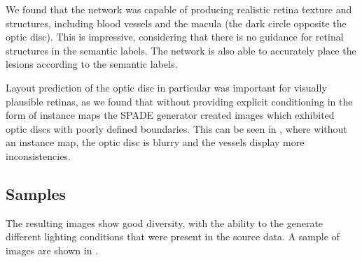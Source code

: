 We found that the network was capable of producing realistic retina texture and structures, including blood vessels and the macula (the dark circle opposite the optic disc).
This is impressive, considering that there is no guidance for retinal structures in the semantic labels.
The network is also able to accurately place the lesions according to the semantic labels.

Layout prediction of the optic disc in particular was important for visually plausible retinas, as we found that without providing explicit conditioning in the form of instance maps the SPADE generator created images which exhibited optic discs with poorly defined boundaries.
This can be seen in , where without an instance map, the optic disc is blurry and the vessels display more inconsistencies.

\subsection{Samples}

The resulting images show good diversity, with the ability to the generate different lighting conditions that were present in the source data.
A sample of images are shown in .

